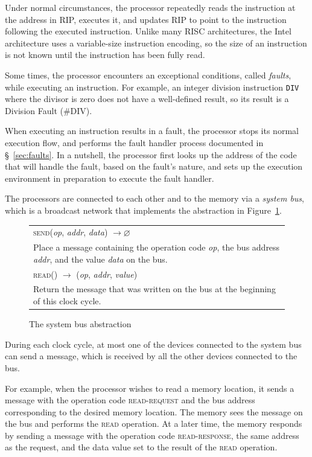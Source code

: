 Under normal circumstances, the processor repeatedly reads the instruction at
the address in RIP, executes it, and updates RIP to point to the instruction
following the executed instruction. Unlike many RISC architectures, the Intel
architecture uses a variable-size instruction encoding, so the size of an
instruction is not known until the instruction has been fully read.

Some times, the processor encounters an exceptional conditions, called
\textit{faults}, while executing an instruction. For example, an integer
division instruction \texttt{DIV} where the divisor is zero does not have a
well-defined result, so its result is a Division Fault (\#DIV).

When executing an instruction results in a fault, the processor stops its
normal execution flow, and performs the fault handler process documented in
\S~\ref{sec:faults}. In a nutshell, the processor first looks up the address of
the code that will handle the fault, based on the fault's nature, and sets up
the execution environment in preparation to execute the fault handler.

The processors are connected to each other and to the memory via a
\textit{system bus}, which is a broadcast network that implements the
abstraction in Figure~\ref{fig:bus_abstraction}.

\begin{figure}[hbt]
  \centering
  \begin{tabularx}{\columnwidth}{| X |}
  \hline
  \textsc{send}(\textit{op}, \textit{addr}, \textit{data})
  $ \rightarrow \varnothing $ \\
  Place a message containing the operation code \textit{op}, the bus address
  \textit{addr}, and the value \textit{data} on the bus. \\
  \hline
  \textsc{read}() $ \rightarrow $ (\textit{op}, \textit{addr},
  \textit{value}) \\
  Return the message that was written on the bus at the beginning of this
  clock cycle. \\
  \hline
  \end{tabularx}
  \caption{The system bus abstraction}
  \label{fig:bus_abstraction}
\end{figure}

During each clock cycle, at most one of the devices connected to the system bus
can send a message, which is received by all the other devices connected to the
bus.

For example, when the processor wishes to read a memory location, it sends a
message with the operation code \textsc{read-request} and the bus address
corresponding to the desired memory location. The memory sees the message on
the bus and performs the \textsc{read} operation. At a later time, the memory
responds by sending a message with the operation code \textsc{read-response},
the same address as the request, and the data value set to the result of the
\textsc{read} operation.

